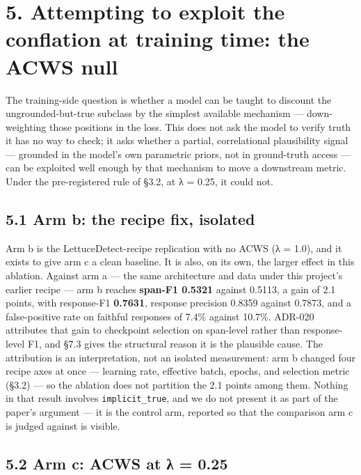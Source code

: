 \documentclass[11pt]{article}
\begin{document}
\section{5. Attempting to exploit the conflation at training time: the ACWS null}\label{attempting-to-exploit-the-conflation-at-training-time-the-acws-null}

The training-side question is whether a model can be taught to discount the
ungrounded-but-true subclass by the simplest available mechanism --- down-weighting those
positions in the loss. This does not ask the model to verify truth it has no way to check;
it asks whether a partial, correlational plausibility signal --- grounded in the model's own
parametric priors, not in ground-truth access --- can be exploited well enough by that
mechanism to move a downstream metric. Under the pre-registered rule of §3.2, at λ = 0.25,
it could not.

\subsection{5.1 Arm b: the recipe fix, isolated}\label{arm-b-the-recipe-fix-isolated}

Arm b is the LettuceDetect-recipe replication with no ACWS (λ = 1.0), and it exists to give
arm c a clean baseline. It is also, on its own, the larger effect in this ablation. Against
arm a --- the same architecture and data under this project's earlier recipe --- arm b reaches
\textbf{span-F1 0.5321} against 0.5113, a gain of 2.1 points, with response-F1 \textbf{0.7631},
response precision 0.8359 against 0.7873, and a false-positive rate on faithful responses of
7.4\% against 10.7\%. ADR-020 attributes that gain to checkpoint selection on span-level
rather than response-level F1, and §7.3 gives the structural reason it is the plausible
cause. The attribution is an interpretation, not an isolated measurement: arm b changed four
recipe axes at once --- learning rate, effective batch, epochs, and selection metric (§3.2) ---
so the ablation does not partition the 2.1 points among them. Nothing in that result
involves \texttt{implicit\_true}, and we do not present it as
part of the paper's argument --- it is the control arm, reported so that the comparison arm c
is judged against is visible.

\subsection{5.2 Arm c: ACWS at λ = 0.25}\label{arm-c-acws-at-ux3bb-0.25}
\end{document}
